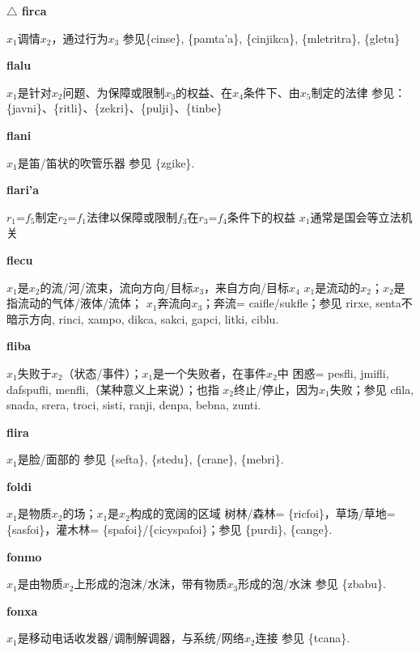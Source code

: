 \documentclass[notitlepage,twocolumn,a4paper,10pt]{book}
\begin{document}
{\sffamily\bfseries $\triangle$ firca} $x_1$调情$x_2$，通过行为$x_3$ \textemdash{} 参见\{cinse\}, \{pamta'a\}, \{cinjikca\}, \{mletritra\}, \{gletu\}

{\sffamily\bfseries flalu}\enspace {\ttfamily\bfseries[    fla]}  $x_1$是针对$x_2$问题、为保障或限制$x_3$的权益、在$x_4$条件下、由$x_5$制定的法律 \textemdash{} 参见：\{javni\}、\{ritli\}、\{zekri\}、\{pulji\}、\{tinbe\}

{\sffamily\bfseries flani} $x_1$是笛\slash{}笛状的吹管乐器 \textemdash{} 参见 \{zgike\}.

{\sffamily\bfseries flari'a} $r_1$=$f_5$制定$r_2$=$f_1$法律以保障或限制$f_3$在$r_3$=$f_4$条件下的权益 \textemdash{} $x_1$通常是国会等立法机关

{\sffamily\bfseries flecu}\enspace {\ttfamily\bfseries[    fle]}  $x_1$是$x_2$的流\slash{}河\slash{}流束，流向方向\slash{}目标$x_3$，来自方向\slash{}目标$x_4$ \textemdash{} $x_1$是流动的$x_2$；$x_2$是指流动的气体\slash{}液体\slash{}流体； $x_1$奔流向$x_3$；奔流= {caifle}\slash{}{sukfle}；参见 {rirxe}, {senta}不暗示方向, {rinci}, {xampo}, {dikca}, {sakci}, {gapci}, {litki}, {ciblu}.

{\sffamily\bfseries fliba}\enspace {\ttfamily\bfseries[    fli]}  $x_1$失败于$x_2$（状态\slash{}事件）；$x_1$是一个失败者，在事件$x_2$中 \textemdash{} 困惑= {pesfli}, {jmifli}, {dafspufli}, {menfli},（某种意义上来说）；也指 $x_2$终止\slash{}停止，因为$x_1$失败；参见 {cfila}, {snada}, {srera}, {troci}, {sisti}, {ranji}, {denpa}, {bebna}, {zunti}.

{\sffamily\bfseries flira}\enspace {\ttfamily\bfseries[fir]}  $x_1$是脸\slash{}面部的 \textemdash{} 参见 \{sefta\}, \{stedu\}, \{crane\}, \{mebri\}.

{\sffamily\bfseries foldi}  $x_1$是物质$x_2$的场；$x_1$是$x_2$构成的宽阔的区域 \textemdash{} 树林\slash{}森林= \{ricfoi\}，草场\slash{}草地= \{sasfoi\}，灌木林= \{spafoi\}\slash{}\{cicyspafoi\}；参见 \{purdi\}, \{cange\}.

{\sffamily\bfseries fonmo}\enspace {\ttfamily\bfseries[fom     fo'o]}  $x_1$是由物质$x_2$上形成的泡沫\slash{}水沫，带有物质$x_3$形成的泡\slash{}水沫 \textemdash{} 参见 \{zbabu\}.

{\sffamily\bfseries fonxa}\enspace {\ttfamily\bfseries[fon]}  $x_1$是移动电话收发器\slash{}调制解调器，与系统\slash{}网络$x_2$连接 \textemdash{} 参见 \{tcana\}.
\end{document}
